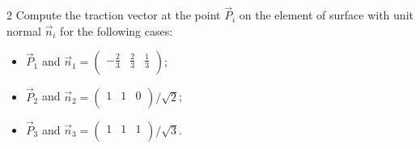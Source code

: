   \begin{problem}{2}
    Compute the traction vector at the point $\Vec{P}_i$ on the element of surface with unit normal $\Vec{n}_i$ for the following cases:
    \begin{itemize}
      \item $\Vec{P}_1$ and $\Vec{n}_1 = \begin{pmatrix}
        -\frac{2}{3} & \frac{2}{3} & \frac{1}{3}\\
      \end{pmatrix}$;
    \item $\Vec{P}_2$ and $\Vec{n}_2  = \begin{pmatrix}
      1 & 1 & 0\\
    \end{pmatrix} / \sqrt{2}$;
    \item $\Vec{P}_3$ and $\Vec{n}_3 = \begin{pmatrix}
      1 & 1 & 1\\
    \end{pmatrix} / \sqrt{3}$.
    \end{itemize}
  \end{problem}


